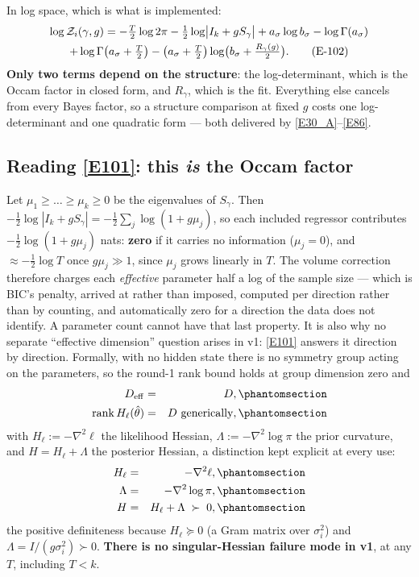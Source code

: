 In log space, which is what is implemented:
\begin{multline}
\log\mathcal{Z}_i(\gamma,g) = -\tfrac{T}{2}\log2\pi - \tfrac12\log\bigl|I_k+gS_\gamma\bigr|
 + a_\sigma\log b_\sigma - \log\Gamma(a_\sigma) \\
 + \log\Gamma\bigl(a_\sigma+\tfrac{T}{2}\bigr)
 - \bigl(a_\sigma+\tfrac{T}{2}\bigr)\log\bigl(b_\sigma+\tfrac{R_\gamma(g)}{2}\bigr).
\tag{E-102}\label{E102}
\end{multline}
\textbf{Only two terms depend on the structure}: the log-determinant, which is the
Occam factor in closed form, and $R_\gamma$, which is the fit. Everything else
cancels from every Bayes factor, so a structure comparison at fixed $g$ costs one
log-determinant and one quadratic form --- both delivered by
\eqref{E30_A}--\eqref{E86}.

\subsection[Reading (E-101)]{Reading \eqref{E101}: this \emph{is} the Occam factor}\label{sec:occam}

Let $\mu_1\ge\dots\ge\mu_k\ge0$ be the eigenvalues of $S_\gamma$. Then
$-\frac12\log|I_k+gS_\gamma|=-\frac12\sum_j\log(1+g\mu_j)$, so each included
regressor contributes $-\frac12\log(1+g\mu_j)$ nats: \textbf{zero} if it carries no
information ($\mu_j=0$), and $\approx-\frac12\log T$ once $g\mu_j\gg1$, since $\mu_j$
grows linearly in $T$. The volume correction therefore charges each \emph{effective}
parameter half a log of the sample size --- which is BIC's penalty, arrived at rather
than imposed, computed per direction rather than by counting, and automatically zero
for a direction the data does not identify. A parameter count cannot have that last
property. It is also why no separate ``effective dimension'' question arises in v1:
\eqref{E101} answers it direction by direction. Formally, with no hidden state there
is no symmetry group acting on the parameters, so the round-1 rank bound holds at
group dimension zero and
\begin{eqnarray}
D_{\eff} &=& D,
  \Elabel{E-21A}{E21_A} \\
\operatorname{rank} H_\ell(\hat\theta) &=& D \text{ generically},
  \Elabel{E-21B}{E21_B}
\end{eqnarray}
with $H_\ell:=-\nabla^2\ell$ the likelihood Hessian,
$\Lambda:=-\nabla^2\log\pi$ the prior curvature, and $H=H_\ell+\Lambda$ the posterior
Hessian, a distinction kept explicit at every use:
\begin{eqnarray}
H_\ell &=& -\nabla^2\ell,
  \Elabel{E-81A}{E81_A} \\
\Lambda &=& -\nabla^2\log\pi,
  \Elabel{E-81B}{E81_B} \\
H &=& H_\ell+\Lambda \;\succ\; 0,
  \Elabel{E-81C}{E81_C}
\end{eqnarray}
the positive definiteness because $H_\ell\succeq0$ (a Gram matrix over $\sigma_i^2$)
and $\Lambda=I/(g\sigma_i^2)\succ0$. \textbf{There is no singular-Hessian failure mode
in v1}, at any $T$, including $T<k$.

